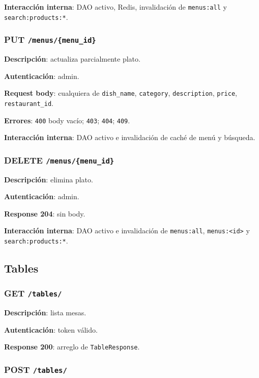 \documentclass[12pt,letterpaper]{article}
\def\codefile#1{\nolinkurl{#1}}
\def\methodget{\textbf{\color{blue!60!black}GET}}
\def\methodpost{\textbf{\color{green!45!black}POST}}
\def\methodput{\textbf{\color{orange!80!black}PUT}}
\def\methoddelete{\textbf{\color{red!70!black}DELETE}}
\begin{document}
\textbf{Interacción interna}: DAO activo, Redis, invalidación de \codefile{menus:all} y \codefile{search:products:*}.

\subsubsection{\methodput{} \codefile{/menus/\{menu\_id\}}}

\textbf{Descripción}: actualiza parcialmente plato.

\textbf{Autenticación}: admin.

\textbf{Request body}: cualquiera de \codefile{dish\_name}, \codefile{category}, \codefile{description}, \codefile{price}, \codefile{restaurant\_id}.

\textbf{Errores}: \codefile{400} body vacío; \codefile{403}; \codefile{404}; \codefile{409}.

\textbf{Interacción interna}: DAO activo e invalidación de caché de menú y búsqueda.

\subsubsection{\methoddelete{} \codefile{/menus/\{menu\_id\}}}

\textbf{Descripción}: elimina plato.

\textbf{Autenticación}: admin.

\textbf{Response 204}: sin body.

\textbf{Interacción interna}: DAO activo e invalidación de \codefile{menus:all}, \codefile{menus:<id>} y \codefile{search:products:*}.

\subsection{Tables}

\subsubsection{\methodget{} \codefile{/tables/}}

\textbf{Descripción}: lista mesas.

\textbf{Autenticación}: token válido.

\textbf{Response 200}: arreglo de \codefile{TableResponse}.

\subsubsection{\methodpost{} \codefile{/tables/}}
\end{document}
